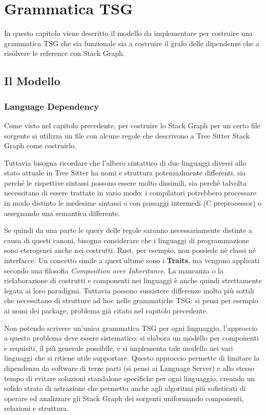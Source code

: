 \chapter{Grammatica TSG}

In questo capitolo viene descritto il modello da implementare per costruire una grammatica TSG che sia funzionale sia a costruire il grafo delle dipendenze che a risolvere le reference con Stack Graph.

\section{Il Modello}

\subsection{Language Dependency}

Come visto nel capitolo precedente, per costruire lo Stack Graph per un certo file sorgente si utilizza un file con alcune regole che descrivono a Tree Sitter Stack Graph come costruirlo.

\par
Tuttavia bisogna ricordare che l'albero sintattico di due linguaggi diversi allo stato attuale in Tree Sitter ha nomi e struttura potenzialmente differenti, sia perch\'e le rispettive sintassi possono essere molto dissimili, sia perch\'e talvolta necessitano di essere trattate in vario modo: i compilatori potrebbero processare in modo distinto le medesime sintassi o con passaggi intermedi (C preprocessor) o assegnando una semantica differente.

\par
Se quindi da una parte le query delle regole saranno necessariamente distinte a causa di questi canoni, bisogna considerare che i linguaggi di programmazione sono eterogenei anche nei costrutti.
Rust, per esempio, non possiede n\'e classi n\'e interfacce. Un concetto simile a quest'ultime sono i \textbf{Traits}, ma vengono applicati secondo una filosofia \emph{Composition over Inheritance}.
La mancanza o la rielaborazione di costrutti e componenti nei linguaggi \`e anche quindi strettamente legata ai loro paradigmi. Tuttavia possono sussistere differenze molto pi\`u sottili che necessitano di strutture ad hoc nelle grammatiche TSG: si pensi per esempio ai nomi dei package, problema gi\`a citato nel capitolo precedente.

\par
Non potendo scrivere un'unica grammatica TSG per ogni linguaggio, l'approccio a questo problema deve essere sistematico: si elabora un modello per componenti e requisiti, il pi\`u generale possibile, e si implementa tale modello nei vari linguaggi che si ritiene utile supportare.
Questo approccio permette di limitare la dipendenza da software di terze parti (si pensi ai Language Server) e allo stesso tempo di evitare soluzioni standalone specifiche per ogni linguaggio, creando un solido strato di astrazione che permetta anche agli algoritmi pi\`u sofisticati di operare ed analizzare gli Stack Graph dei sorgenti uniformando componenti, relazioni e struttura.

